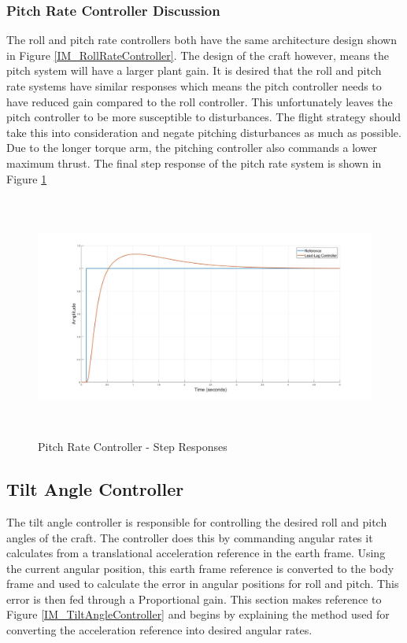 		\subsubsection{Pitch Rate Controller Discussion}
		The roll and pitch rate controllers both have the same architecture design shown in Figure \ref{IM_RollRateController}. The design of the craft however, means the pitch system will have a larger plant gain. It is desired that the roll and pitch rate systems have similar responses which means the pitch controller needs to have reduced gain compared to the roll controller. This unfortunately leaves the pitch controller to be more susceptible to disturbances. The flight strategy should take this into consideration and negate pitching disturbances as much as possible. Due to the longer torque arm, the pitching controller also commands a lower maximum thrust. The final step response of the pitch rate system is shown in Figure \ref{IM_PitchRateStep}
		
		\begin{figure}[H]
			\centering
			\includegraphics[height = 8cm]{../Design/Matlab/Controllers/pitch_rate_step.jpg}
			\caption{Pitch Rate Controller -  Step Responses}
			\label{IM_PitchRateStep}
		\end{figure}
		
	\subsection{Tilt Angle Controller}
	The tilt angle controller is responsible for controlling the desired roll and pitch angles of the craft. The controller does this by commanding angular rates it calculates from a translational acceleration reference in the earth frame. Using the current angular position, this earth frame reference is converted to the body frame and used to calculate the error in angular positions for roll and pitch. This error is then fed through a Proportional gain. This section makes reference to Figure \ref{IM_TiltAngleController} and begins by explaining the method used for converting the acceleration reference into desired angular rates.
	
